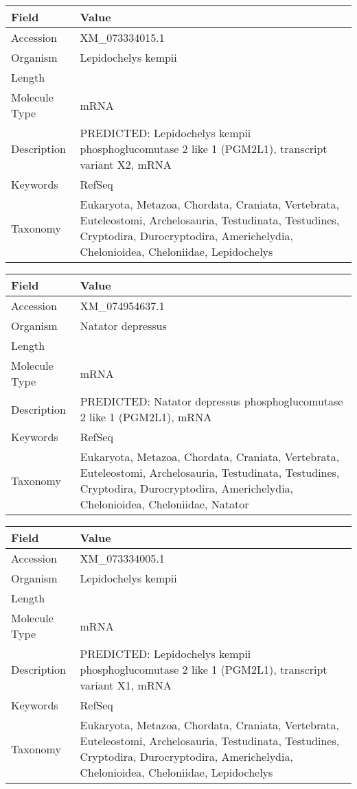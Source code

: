 \documentclass[10pt]{article}
\begin{document}
{\footnotesize
\begin{longtable}{>{\raggedright\arraybackslash}p{4.5cm} >{\raggedright\arraybackslash}p{11.5cm}}
\textbf{Field} & \textbf{Value} \\
\hline
Accession & XM\_073334015.1 \\
Organism & Lepidochelys kempii \\
Length & 7810 \\
Molecule Type & mRNA \\
Description & PREDICTED: Lepidochelys kempii phosphoglucomutase 2 like 1 (PGM2L1), transcript variant X2, mRNA \\
Keywords & RefSeq \\
Taxonomy & Eukaryota, Metazoa, Chordata, Craniata, Vertebrata, Euteleostomi, Archelosauria, Testudinata, Testudines, Cryptodira, Durocryptodira, Americhelydia, Chelonioidea, Cheloniidae, Lepidochelys \\
\end{longtable}
}

{\footnotesize
\begin{longtable}{>{\raggedright\arraybackslash}p{4.5cm} >{\raggedright\arraybackslash}p{11.5cm}}
\textbf{Field} & \textbf{Value} \\
\hline
Accession & XM\_074954637.1 \\
Organism & Natator depressus \\
Length & 7759 \\
Molecule Type & mRNA \\
Description & PREDICTED: Natator depressus phosphoglucomutase 2 like 1 (PGM2L1), mRNA \\
Keywords & RefSeq \\
Taxonomy & Eukaryota, Metazoa, Chordata, Craniata, Vertebrata, Euteleostomi, Archelosauria, Testudinata, Testudines, Cryptodira, Durocryptodira, Americhelydia, Chelonioidea, Cheloniidae, Natator \\
\end{longtable}
}

{\footnotesize
\begin{longtable}{>{\raggedright\arraybackslash}p{4.5cm} >{\raggedright\arraybackslash}p{11.5cm}}
\textbf{Field} & \textbf{Value} \\
\hline
Accession & XM\_073334005.1 \\
Organism & Lepidochelys kempii \\
Length & 8039 \\
Molecule Type & mRNA \\
Description & PREDICTED: Lepidochelys kempii phosphoglucomutase 2 like 1 (PGM2L1), transcript variant X1, mRNA \\
Keywords & RefSeq \\
Taxonomy & Eukaryota, Metazoa, Chordata, Craniata, Vertebrata, Euteleostomi, Archelosauria, Testudinata, Testudines, Cryptodira, Durocryptodira, Americhelydia, Chelonioidea, Cheloniidae, Lepidochelys \\
\end{longtable}
}
\end{document}
